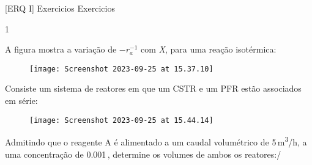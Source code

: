 \documentclass[\mainfilename]{subfiles}
\begin{document}
\graphicspath{{\subfix{./.build/figures/ERQ_I-Exercicios_Resolucoes.1}}}

[ERQ I]
{Exercicios} %
{Exercicios} %

\begin{questionBox}1{ %
    A figura mostra a variação de \(-r_a^{-1}\) com \textit{X}, para uma reação isotérmica:
    \vspace{2ex}
    \begin{center}
        \Large{}
    \end{center}
    \begin{figure}\centering
        \texttt{[image: Screenshot 2023-09-25 at 15.37.10]}
    \end{figure}
    Consiste um sistema de reatores em que um CSTR e um PFR estão associados em série:
    \begin{figure}\centering
        \texttt{[image: Screenshot 2023-09-25 at 15.44.14]}
    \end{figure}
    Admitindo que o reagente A é alimentado a um caudal volumétrico de 5\,\si{\metre^3/\hour}, a uma concentração de 0.001\,\si{\molar}, determine os volumes de ambos os reatores:/
} %
\end{questionBox}
\end{document}
